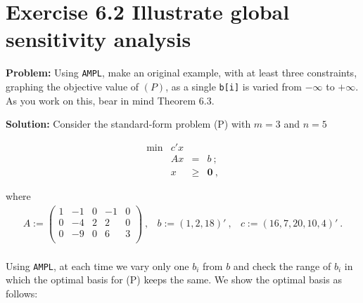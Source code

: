 \section{Exercise 6.2 Illustrate global sensitivity analysis}
\textbf{Problem:} Using {\tt AMPL}, make an original example, with at least three constraints, graphing the objective value of $(P)$, as a single {\tt b[i]} is varied from $-\infty$ to $+\infty$. As you work on this, bear in mind Theorem 6.3.

\textbf{Solution:} Consider the standard-form problem (P) with $m=3$ and $n=5$

\[
\tag{P}
\begin{array}{rrcl}
 \min & c'x  &      &   \\
      &  Ax  &   =  & b~; \\
      &   x  & \geq & \mathbf{0}~,
\end{array}
\]

where
\[
\begin{array}{ccc}
A  :=  \left(
  \begin{array}{ccccc}
    1 & -1 & 0 & -1 & 0  \\
    0 & -4 & 2 & 2 & 0 \\
    0 & -9 & 0 & 6 & 3\\
  \end{array}
\right)~, &
b  :=  (1,2,18)'~,&
c  :=  (16, 7, 20, 10, 4)'~.\\

\end{array}
\]

Using {\tt AMPL}, at each time we vary only one $b_i$ from $b$ and check the range of $b_i$ in which the optimal basis for (P) keeps the same. We show the optimal basis as follows:

